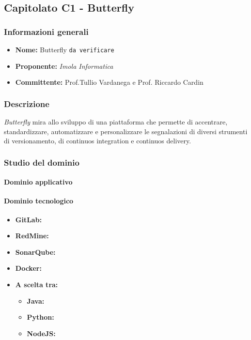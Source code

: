 \subsection{Capitolato C1 - Butterfly}
\subsubsection{Informazioni generali}
\begin{itemize}
\item
\textbf{Nome:} Butterfly \texttt{da verificare}
\item
\textbf{Proponente:} \textit{Imola Informatica} 
\item
\textbf{Committente:} Prof.Tullio Vardanega e Prof. Riccardo Cardin
\end{itemize}
\subsubsection{Descrizione}
\textit{Butterfly} mira allo sviluppo di una piattaforma che permette di
 accentrare, standardizzare, automatizzare e personalizzare le segnalazioni di
 diversi strumenti di versionamento, di continuos integration e continuos delivery.
\subsubsection{Studio del dominio}
\paragraph{Dominio applicativo}
\paragraph{Dominio tecnologico}
\begin{itemize}
	\item 
	\textbf{GitLab: }
	\item
	\textbf{RedMine:}
	\item
	\textbf{SonarQube:}
	\item
	\textbf{Docker: }
	\item
	\textbf{A scelta tra:}
		\begin{itemize}
			\item\textbf{Java: }
			\item\textbf{Python: }
			\item\textbf{NodeJS: }
		\end{itemize}
\end{itemize}
